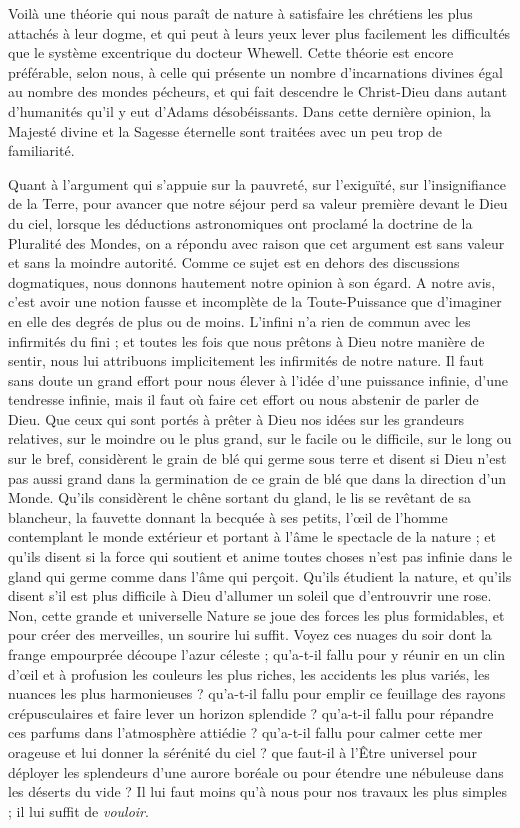 \documentclass[a4paper, 11pt, oneside]{article}
\begin{document}
Voilà une théorie qui nous paraît de nature à satisfaire les chrétiens les plus attachés à leur dogme, et qui peut à leurs yeux lever plus facilement les difficultés que le système excentrique du docteur Whewell. Cette théorie est encore préférable, selon nous, à celle qui présente un nombre d'incarnations divines égal au nombre des mondes pécheurs, et qui fait descendre le Christ-Dieu dans autant d'humanités qu'il y eut d'Adams désobéissants. Dans cette dernière opinion, la Majesté divine et la Sagesse éternelle sont traitées avec un peu trop de familiarité.

Quant à l'argument qui s'appuie sur la pauvreté, sur l'exiguïté, sur l'insignifiance de la Terre, pour avancer que notre séjour perd sa valeur première devant le Dieu du ciel, lorsque les déductions astronomiques ont proclamé la doctrine de la Pluralité des Mondes, on a répondu avec raison que cet argument est sans valeur et sans la moindre autorité. Comme ce sujet est en dehors des discussions dogmatiques, nous donnons hautement notre opinion à son égard. A notre avis, c'est avoir une notion fausse et incomplète de la Toute-Puissance que d'imaginer en elle des degrés de plus ou de moins. L'infini n'a rien de commun avec les infirmités du fini ; et toutes les fois que nous prêtons à Dieu notre manière de sentir, nous lui attribuons implicitement les infirmités de notre nature. Il faut sans doute un grand effort pour nous élever à l'idée d'une puissance infinie, d'une tendresse infinie, mais il faut où faire cet effort ou nous abstenir de parler de Dieu. Que ceux qui sont portés à prêter à Dieu nos idées sur les grandeurs relatives, sur le moindre ou le plus grand, sur le facile ou le difficile, sur le long ou sur le bref, considèrent le grain de blé qui germe sous terre et disent si Dieu n'est pas aussi grand dans la germination de ce grain de blé que dans la direction d'un Monde. Qu'ils considèrent le chêne sortant du gland, le lis se revêtant de sa blancheur, la fauvette donnant la becquée à ses petits, l'œil de l'homme contemplant le monde extérieur et portant à l'âme le spectacle de la nature ; et qu'ils disent si la force qui soutient et anime toutes choses n'est pas infinie dans le gland qui germe comme dans l'âme qui perçoit. Qu'ils étudient la nature, et qu'ils disent s'il est plus difficile à Dieu d'allumer un soleil que d'entrouvrir une rose. Non, cette grande et universelle Nature se joue des forces les plus formidables, et pour créer des merveilles, un sourire lui suffit. Voyez ces nuages du soir dont la frange empourprée découpe l'azur céleste ; qu'a-t-il fallu pour y réunir en un clin d'œil et à profusion les couleurs les plus riches, les accidents les plus variés, les nuances les plus harmonieuses ? qu'a-t-il fallu pour emplir ce feuillage des rayons crépusculaires et faire lever un horizon splendide ? qu'a-t-il fallu pour répandre ces parfums dans l'atmosphère attiédie ? qu'a-t-il fallu pour calmer cette mer orageuse et lui donner la sérénité du ciel ? que faut-il à l'Être universel pour déployer les splendeurs d'une aurore boréale ou pour étendre une nébuleuse dans les déserts du vide ? Il lui faut moins qu'à nous pour nos travaux les plus simples ; il lui suffit de \emph{vouloir}.
\end{document}
